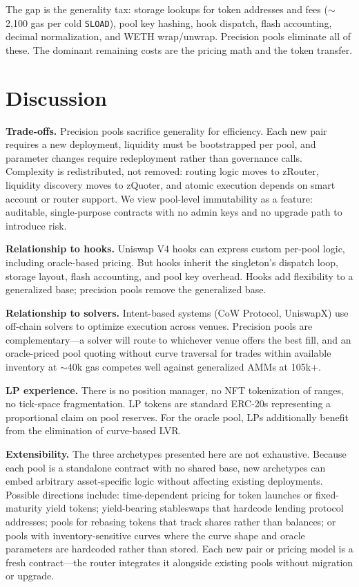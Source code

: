 \documentclass[10pt,twocolumn]{article}
\begin{document}
The gap is the generality tax: storage lookups for token addresses and fees (${\sim}$2,100 gas per cold \texttt{SLOAD}), pool key hashing, hook dispatch, flash accounting, decimal normalization, and WETH wrap/unwrap. Precision pools eliminate all of these. The dominant remaining costs are the pricing math and the token transfer.

\section{Discussion}

\textbf{Trade-offs.} Precision pools sacrifice generality for efficiency. Each new pair requires a new deployment, liquidity must be bootstrapped per pool, and parameter changes require redeployment rather than governance calls. Complexity is redistributed, not removed: routing logic moves to zRouter, liquidity discovery moves to zQuoter, and atomic execution depends on smart account or router support. We view pool-level immutability as a feature: auditable, single-purpose contracts with no admin keys and no upgrade path to introduce risk.

\textbf{Relationship to hooks.} Uniswap V4 hooks can express custom per-pool logic, including oracle-based pricing. But hooks inherit the singleton's dispatch loop, storage layout, flash accounting, and pool key overhead. Hooks add flexibility to a generalized base; precision pools remove the generalized base.

\textbf{Relationship to solvers.} Intent-based systems (CoW Protocol, UniswapX) use off-chain solvers to optimize execution across venues. Precision pools are complementary---a solver will route to whichever venue offers the best fill, and an oracle-priced pool quoting without curve traversal for trades within available inventory at ${\sim}$40k gas competes well against generalized AMMs at 105k+.

\textbf{LP experience.} There is no position manager, no NFT tokenization of ranges, no tick-space fragmentation. LP tokens are standard ERC-20s representing a proportional claim on pool reserves. For the oracle pool, LPs additionally benefit from the elimination of curve-based LVR.

\textbf{Extensibility.} The three archetypes presented here are not exhaustive. Because each pool is a standalone contract with no shared base, new archetypes can embed arbitrary asset-specific logic without affecting existing deployments. Possible directions include: time-dependent pricing for token launches or fixed-maturity yield tokens; yield-bearing stableswaps that hardcode lending protocol addresses; pools for rebasing tokens that track shares rather than balances; or pools with inventory-sensitive curves where the curve shape and oracle parameters are hardcoded rather than stored. Each new pair or pricing model is a fresh contract---the router integrates it alongside existing pools without migration or upgrade.
\end{document}
